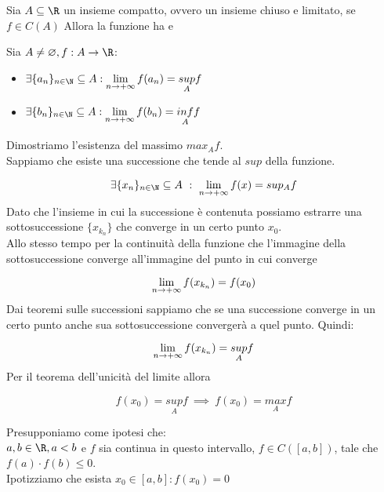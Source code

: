 \documentclass[../analisi.tex]{subfiles}
\begin{document}
\begin{defn}
Sia $\acr$ un insieme compatto, ovvero un insieme chiuso e limitato, se $f \in C(A)$
Allora la funzione ha  e 
\end{defn}

\begin{dimo}
Sia $A \neq \varnothing, f: A \to \R$:

\begin{itemize}
	\item $\exists \{a_n\}_{n \in \N} \subseteq A: \lim
		\limits_{\nti} f(a_n) = \underset{A}{sup} f $
	\item $\exists \{b_n\}_{n \in \N} \subseteq A: \lim
		\limits_{\nti} f(b_n) = \underset{A}{inf} f $

\end{itemize}
Dimostriamo l'esistenza del massimo $max_A f$.\\
Sappiamo che esiste una successione che tende al $sup$ della funzione.

\begin{equation}
	\exists \{x_n\}_{n \in \N} \subseteq A\ :\ \lim \limits_{\nti} f(x) =
	sup_A f
\end{equation}
Dato che l'insieme in cui la successione è contenuta possiamo estrarre una 
sottosuccessione $ \{ x_{k_n} \}$ che converge in un certo punto $x_0$.\\
Allo stesso tempo per la continuità della funzione che l'immagine della 
sottosuccessione converge all'immagine del punto in cui converge 

\begin{equation}
	\lim \limits_{n \to + \infty} f (x_{k_n}) = f (x_0)
\end{equation}
Dai teoremi sulle successioni sappiamo che se una successione converge
in un certo punto anche  sua sottosuccessione convergerà a 
quel punto. Quindi:

\begin{equation}
	\lim \limits_{n \to + \infty} f(x_{k_n}) = \underset{A}{sup} f
\end{equation}
Per il teorema dell'unicità del limite allora 

\begin{equation}
	f(x_0) = \underset{A}{sup} f\ \implies\ 
	f(x_0) = \underset{A}{max} f
\end{equation}
\end{dimo}

\begin{defn}
Presupponiamo come ipotesi che:\\
$a,b \in \R, a < b$ e $f$ sia continua in questo intervallo, $f \in C([a,b])$, 
tale che $f(a) \cdot f(b) \leq 0$.\\
Ipotizziamo che esista $ x_0 \in [a,b]: f(x_0) = 0$
\end{defn}
\end{document}
